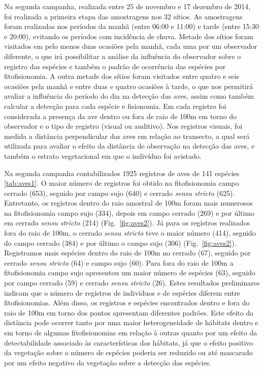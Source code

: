Na segunda campanha, realizada entre 25 de novembro e 17 dezembro de
2014, foi realizada a primeira etapa das amostragens nos 32 sítios. 
As amostragens foram realizadas nos períodos da manhã (entre 06:00 e
11:00) e tarde (entre 15:30 e 20:00), evitando os períodos com
incidência de chuva. Metade dos sítios foram visitados em
pelo menos duas ocasiões pela manhã, cada uma por um observador
diferente, o que irá possibilitar a análise da influência do
observador sobre o registro das espécies e também o
padrão de ocorrência das espécies por fitofisionomia. A outra metade
dos sítios foram visitados entre quatro e seis ocasiões pela manhã e
entre duas e quatro ocasiões à tarde, o que nos permitirá avaliar a
influência do período do dia na detecção das aves, assim como também
calcular a detecção para cada espécie e fisionomia. Em cada registro
foi considerada a presença da ave dentro ou fora de raio de 100m em torno do observador
e o tipo de registro (visual ou auditivo). Nos registros visuais, foi
medida a distância perpendicular das aves em relação ao
transecto, a qual será utilizada para avaliar o efeito da distância de
observação na detecção das aves, e também o estrato vegetacional em que o
indivíduo foi avistado. 

Na segunda campanha
contabilizados 1925 registros de aves de 141 espécies \ref{tab:aves1}.
O maior número de
registros foi obtido na fitofisionomia campo cerrado (653), seguido
por campo sujo (640) e cerrado \textit{sensu stricto}
(625). Entretanto, os
registros dentro do raio amostral de 100m foram mais numerosos na
fitofisionomia campo sujo (334), depois em campo cerrado (269) e por
último em cerrado \textit{sensu stricto} (214) (Fig.~\ref{fig:aves2}). 
Já para os
registros realizados fora do raio de 100m,
o cerrado \textit{sensu stricto} teve o maior número (414), 
seguido do campo cerrado (384) e
por último o campo sujo (306) (Fig.~\ref{fig:aves2}). 
Registramos mais espécies dentro do raio de 100m no
cerrado (67), seguido por cerrado \textit{sensu stricto} (64) e campo
sujo (60). Para fora do raio de 100m 
a fitofisionomia campo sujo apresentou um maior número de espécies (63), seguido por campo
cerrado (59) e cerrado \textit{sensu stricto} (26).
Estes resultados preliminares indicam que o número de registros de indivíduos e de espécies
diferem entre fitofisionomias. Além disso, 
os registros e espécies encontrados dentro e fora do raio de 100m
em torno dos pontos apresentam diferentes padrões. Este efeito da
distância pode ocorrer tanto por uma maior heterogeneidade de hábitats
dentro e em torno de algumas fitofisionomias em relação à outras quanto por um
efeito da detectabilidade associado às características dos hábitats,
já que o efeito positivo da vegetação sobre o número de espécies
poderia ser reduzido ou até mascarado por um efeito negativo da
vegetação sobre a detecção das espécies.


